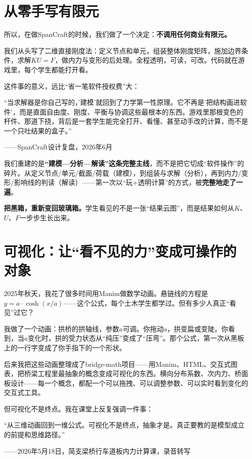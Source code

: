 \section{从零手写有限元}

所以，在做SpanCraft的时候，我们做了一个决定：\textbf{不调用任何商业有限元。}

我们从头写了二维直接刚度法：定义节点和单元，组装整体刚度矩阵，施加边界条件，求解$KU=F$，做内力与变形的后处理。全程透明，可读，可改。代码就在游戏里，每个学生都能打开看。

这件事的意义，远比``省一笔软件授权费''大：

\begin{shiyu-inline}
``当求解器是你自己写的，'建模'就回到了力学第一性原理。它不再是'把结构画进软件'，而是直面自由度、刚度、平衡与协调这些最根本的东西。游戏里那根变色的杆件、那道下挠，背后是一套学生能完全打开、看懂、甚至动手改的计算，而不是一个只吐结果的盒子。''

\hfill ——SpanCraft设计复盘，2026年6月
\end{shiyu-inline}

我们重建的是\textbf{``建模—分析—解读''这条完整主线}，而不是把它切成``软件操作''的碎片。从定义节点/单元/截面/荷载（建模），到组装与求解（分析），再到内力/变形/影响线的判读（解读）——第一次以``玩+透明计算''的方式，被\textbf{完整地走了一遍}。

\textbf{把黑箱，重新变回玻璃箱。}学生看见的不是一张``结果云图''，而是结果如何从$K$、$U$、$F$一步步生长出来。

\section{可视化：让``看不见的力''变成可操作的对象}

2025年秋天，我花了很多时间用Manim做数学动画。悬链线的方程是$y=a\cdot\cosh(x/a)$——这个公式，每个土木学生都学过。但有多少人真正``看见''过它？

我做了一个动画：拱桥的拱轴线，参数$a$可调。你拖动$a$，拱变扁或变陡。你看到，当$a$变化时，拱的受力状态从``纯压''变成了``压弯''。那个公式，第一次从黑板上的一行字变成了你手指下的一个形状。

后来我把这些动画整理成了bridge-math项目——用Manim、HTML、交互式图表，把桥梁工程里最抽象的概念变成可视化的东西。横向分布系数、次内力、桥面板设计——每一个概念，都配一个可以拖拽、可以调整参数、可以实时看到变化的交互式工具。

但可视化不是终点。我在课堂上反复强调一件事：

\begin{shiyu-inline}
``从三维动画回到一维公式。可视化不是终点，抽象才是。真正要教的是模型成立的前提和思维路径。''

\hfill ——2026年5月18日，简支梁桥行车道板内力计算课，录音转写
\end{shiyu-inline}

